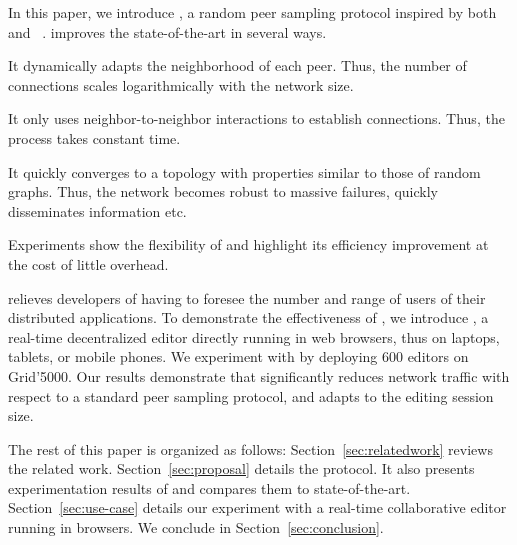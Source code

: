 In this paper, we introduce \SPRAY, a random peer sampling protocol inspired by
both \SCAMP~\cite{ganesh2003peer} and \CYCLON~\cite{voulgaris2005cyclon}. \SPRAY
improves the state-of-the-art in several ways.
\begin{inparaenum}[(i)]
\item It dynamically adapts the neighborhood of each peer. Thus, the
  number of connections scales logarithmically with the network size.
\item It only uses neighbor-to-neighbor interactions to establish
  connections. Thus, the process takes constant time.
\item It quickly converges to a topology with properties similar to
  those of random graphs. Thus, the network becomes robust to massive
  failures, quickly disseminates information etc.
\item Experiments show the flexibility of \SPRAY and highlight its
  efficiency improvement at the cost of little overhead.
\end{inparaenum}

\SPRAY relieves developers of having to foresee the number and range of users of
their distributed applications.  To demonstrate the effectiveness of \SPRAY, we
introduce \CRATE, a real-time decentralized editor directly running in web
browsers, thus on laptops, tablets, or mobile phones. We experiment with \CRATE
by deploying 600 editors on Grid'5000. Our results demonstrate that \SPRAY
significantly reduces network traffic with respect to a standard peer sampling
protocol, and adapts to the editing session size.

The rest of this paper is organized as follows: Section~\ref{sec:relatedwork}
reviews the related work. Section~\ref{sec:proposal} details the \SPRAY
protocol. It also presents experimentation results of \SPRAY and compares them
to state-of-the-art. Section~\ref{sec:use-case} details our experiment with
\CRATE a real-time collaborative editor running in browsers. We conclude in
Section~\ref{sec:conclusion}.

